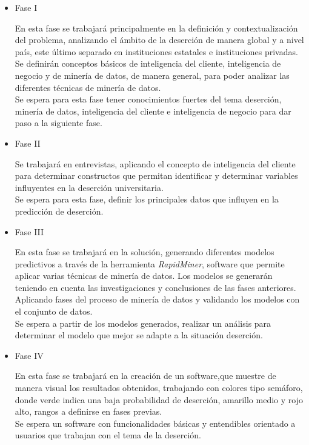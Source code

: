 \begin{itemize}
    \item Fase I
    
   En esta fase se trabajará principalmente en la definición y contextualización del problema, analizando el ámbito de la deserción de manera global y a nivel país, este último separado en instituciones estatales e instituciones privadas. Se definirán conceptos básicos de inteligencia del cliente, inteligencia de negocio y de minería de datos, de manera general, para poder analizar las diferentes técnicas de minería de datos. \\
    
    Se espera para esta fase tener conocimientos fuertes del tema deserción, minería de datos, inteligencia del cliente e inteligencia de negocio para dar paso a la siguiente fase.\\
    
    \item Fase II
    
    Se trabajará en entrevistas, aplicando el concepto de inteligencia del cliente para determinar constructos que permitan identificar y determinar variables influyentes en la deserción universitaria.\\   
    
    Se espera para esta fase, definir los principales datos que influyen en la predicción de deserción.\\
    
    \item Fase III
    
    En esta fase se trabajará en la solución, generando diferentes modelos predictivos a través de la herramienta \textit{RapidMiner}, software que permite aplicar varias técnicas de minería de datos. Los modelos se generarán teniendo en cuenta las investigaciones y conclusiones de las fases anteriores. Aplicando fases del proceso de minería de datos y validando los modelos con el conjunto de datos.\\
    
    Se espera a partir de los modelos generados, realizar un análisis para determinar el modelo que mejor se adapte a la situación deserción.\\
    
    \item Fase IV
    
    En esta fase se trabajará en la creación de un software,que muestre de manera visual los resultados obtenidos, trabajando con colores tipo semáforo, donde verde indica una baja probabilidad de deserción, amarillo medio y rojo alto, rangos a definirse en fases previas.\\
    
    Se espera un software con funcionalidades básicas y entendibles orientado a usuarios que trabajan con el tema de la deserción.

\end{itemize}


